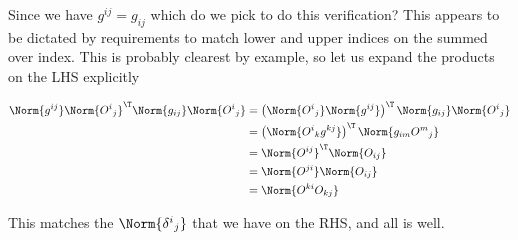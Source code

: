 Since we have $g^{i j} = g_{i j}$ which do we pick to do this verification?  This appears to be dictated by requirements to match lower and upper indices on the summed over index.  This is probably clearest by example, so let us expand the products on the LHS explicitly

\begin{equation}\label{eqn:relativisticElectrodynamicsL11b:1500}
\begin{aligned}
\Norm{ g^{i j} } 
\Norm{ {O^{i}}_j } ^\T
\Norm{ g_{i j} }
\Norm{ {O^{i}}_j } 
&=
\left( \Norm{ {O^{i}}_j } 
\Norm{ g^{i j} } \right) ^\T
\Norm{ g_{i j} }
\Norm{ {O^{i}}_j }  \\
&=
\left( \Norm{ {O^{i}}_k g^{k j} } \right) ^\T
\Norm{ g_{i m} {O^{m}}_j }  \\
&=
\Norm{ O^{i j} } ^\T
\Norm{ O_{i j} }  \\
&=
\Norm{ O^{j i} } 
\Norm{ O_{i j} }  \\
&=
\Norm{ O^{k i} O_{k j} }  \\
\end{aligned}
\end{equation}

This matches the $\Norm{{\delta^i}_j}$ that we have on the RHS, and all is well.
